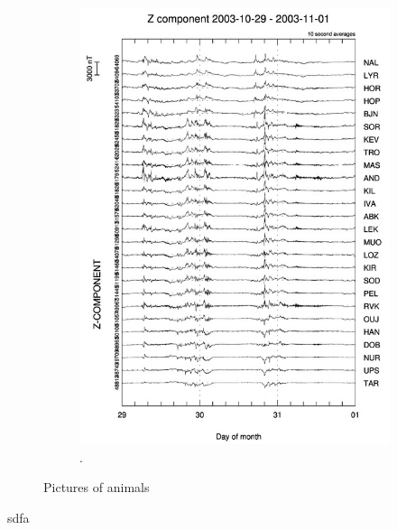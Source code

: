 \begin{figure}[H]
\begin{subfigure}[b]{0.33\textwidth}
                \includegraphics[width=\linewidth]{figures/IMAGE_Z_gram.jpg}
                \caption{\cite{image}.}
				\label{fig:image_z_gram}
        \end{subfigure}
        \caption{Pictures of animals}
        \label{fig:image_grams}
\end{figure}






sdfa






